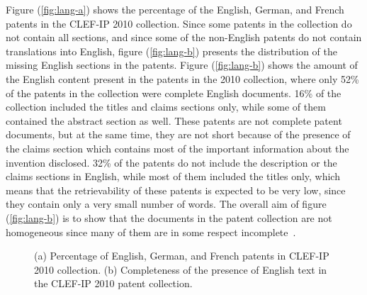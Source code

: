 Figure (\ref{fig:lang-a}) shows the percentage of the English, German, and French patents in the CLEF-IP 2010 collection. Since some patents in the collection do not contain all sections, and since some of the non-English patents do not contain translations into English, figure (\ref{fig:lang-b}) presents the distribution of the missing English sections in the patents. Figure (\ref{fig:lang-b}) shows the amount of the English content present in the patents in the 2010 collection, where only 52\% of the patents in the collection were complete English documents. 16\% of the collection included the titles and claims sections only, while some of them contained the abstract section as well. These patents are not complete patent documents, but at the same time, they are not short because of the presence of the claims section which contains most of the important information about the invention disclosed. 32\% of the patents do not include the description or the claims sections in English, while most of them included the titles only, which means that the retrievability of these patents is expected to be very low, since they contain only a very small number of words. The overall aim of figure (\ref{fig:lang-b}) is to show that the documents in the patent collection are not homogeneous since many of them are in some respect incomplete~\citep{magdy2012toward}.
\begin{figure}[t!]
\begin{centering}
 \hspace*{1.5cm} 
\par\end{centering} 
\protect\caption{(a) Percentage of English, German, and French patents in CLEF-IP 2010 collection.
                (b) Completeness of the presence of English text in the CLEF-IP 2010 patent collection.~\citep{magdy2012toward}}
\label{fig:lang}
\end{figure}
